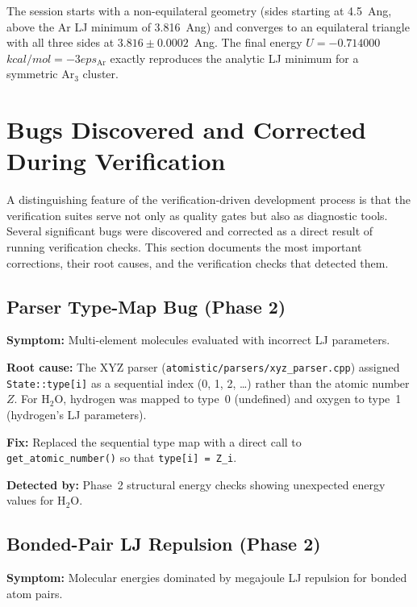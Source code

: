 \documentclass[11pt,twoside]{article}
\def\AA{Ang}%
\def\varepsilon{eps}%
\def\kcalmol{kcal/mol}%
\newcommand{\kcalmol}{\text{kcal/mol}}
\newcommand{\file}[1]{\texttt{#1}}
\newcommand{\field}[1]{\texttt{#1}}
\newcommand{\op}[1]{\texttt{#1}}
\begin{document}
The session starts with a non-equilateral geometry (sides starting at 4.5~\AA, above the Ar LJ minimum of 3.816~\AA) and converges to an equilateral triangle with all three sides at $3.816 \pm 0.0002$~\AA. The final energy $U = -0.714000$~$\kcalmol = -3\varepsilon_{\mathrm{Ar}}$ exactly reproduces the analytic LJ minimum for a symmetric Ar$_3$ cluster.

\section{Bugs Discovered and Corrected During Verification}
\label{sec:bugs}

A distinguishing feature of the verification-driven development process is that the verification suites serve not only as quality gates but also as diagnostic tools. Several significant bugs were discovered and corrected as a direct result of running verification checks. This section documents the most important corrections, their root causes, and the verification checks that detected them.

\subsection{Parser Type-Map Bug (Phase 2)}

\textbf{Symptom:} Multi-element molecules evaluated with incorrect LJ parameters.

\textbf{Root cause:} The XYZ parser (\file{atomistic/parsers/xyz\_parser.cpp}) assigned \field{State::type[i]} as a sequential index (0, 1, 2, \ldots) rather than the atomic number $Z$. For H$_2$O, hydrogen was mapped to type~0 (undefined) and oxygen to type~1 (hydrogen's LJ parameters).

\textbf{Fix:} Replaced the sequential type map with a direct call to \op{get\_atomic\_number()} so that \field{type[i] = Z\_i}.

\textbf{Detected by:} Phase~2 structural energy checks showing unexpected energy values for H$_2$O.

\subsection{Bonded-Pair LJ Repulsion (Phase 2)}

\textbf{Symptom:} Molecular energies dominated by megajoule LJ repulsion for bonded atom pairs.
\end{document}
